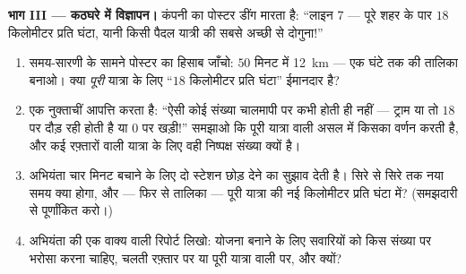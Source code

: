 \begin{problem}
\medskip\noindent\textbf{भाग III --- कठघरे में विज्ञापन।}
कंपनी का पोस्टर डींग मारता है: ``लाइन 7 --- पूरे शहर के पार $18$
किलोमीटर प्रति घंटा, यानी किसी पैदल यात्री की सबसे अच्छी  से
दोगुना!''
\begin{enumerate}[resume]
  \item समय-सारणी के सामने पोस्टर का हिसाब जाँचो: $50$ मिनट में
        \qty{12}{km} --- एक घंटे तक की तालिका बनाओ। क्या \emph{पूरी}
        यात्रा के लिए ``$18$ किलोमीटर प्रति घंटा'' ईमानदार है?
  \item एक नुक्ताचीं आपत्ति करता है: ``ऐसी कोई संख्या चालमापी पर
        कभी होती ही नहीं --- ट्राम या तो $18$ पर दौड़ रही होती है
        या $0$ पर खड़ी!'' समझाओ कि पूरी यात्रा वाली  असल में
        किसका वर्णन करती है, और कई रफ़्तारों वाली यात्रा के लिए वही
        निष्पक्ष संख्या क्यों है।
  \item अभियंता चार मिनट बचाने के लिए दो स्टेशन छोड़ देने का सुझाव
        देती है। सिरे से सिरे तक नया समय क्या होगा, और --- फिर से
        तालिका --- पूरी यात्रा की नई  किलोमीटर प्रति घंटा में?
        (समझदारी से पूर्णांकित करो।)
  \item अभियंता की एक वाक्य वाली रिपोर्ट लिखो: योजना बनाने के लिए
        सवारियों को किस संख्या पर भरोसा करना चाहिए, चलती रफ़्तार पर
        या पूरी यात्रा वाली  पर, और क्यों?
\end{enumerate}
\end{problem}
